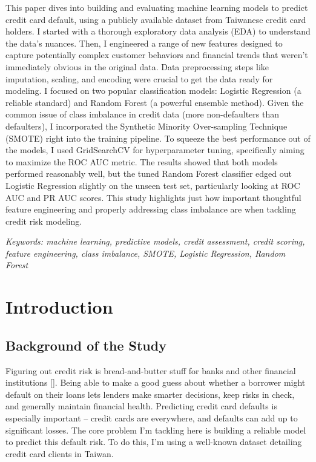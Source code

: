 \documentclass[a4paper,12pt]{article}
\begin{document}
This paper dives into building and evaluating machine learning models to predict credit card default, using a publicly available dataset from Taiwanese credit card holders. I started with a thorough exploratory data analysis (EDA) to understand the data's nuances. Then, I engineered a range of new features designed to capture potentially complex customer behaviors and financial trends that weren't immediately obvious in the original data. Data preprocessing steps like imputation, scaling, and encoding were crucial to get the data ready for modeling. I focused on two popular classification models: Logistic Regression (a reliable standard) and Random Forest (a powerful ensemble method). Given the common issue of class imbalance in credit data (more non-defaulters than defaulters), I incorporated the Synthetic Minority Over-sampling Technique (SMOTE) right into the training pipeline. To squeeze the best performance out of the models, I used GridSearchCV for hyperparameter tuning, specifically aiming to maximize the ROC AUC metric. The results showed that both models performed reasonably well, but the tuned Random Forest classifier edged out Logistic Regression slightly on the unseen test set, particularly looking at ROC AUC and PR AUC scores. This study highlights just how important thoughtful feature engineering and properly addressing class imbalance are when tackling credit risk modeling.

\textit{Keywords: machine learning, predictive models, credit assessment, credit scoring, feature engineering, class imbalance, SMOTE, Logistic Regression, Random Forest}

\newpage

\pagestyle{plain}

\section{Introduction}\label{introduction}

\subsection{Background of the Study}

Figuring out credit risk is bread-and-butter stuff for banks and other financial institutions [\cite{hand1997statistical}]. Being able to make a good guess about whether a borrower might default on their loans lets lenders make smarter decisions, keep risks in check, and generally maintain financial health. Predicting credit card defaults is especially important – credit cards are everywhere, and defaults can add up to significant losses. The core problem I'm tackling here is building a reliable model to predict this default risk. To do this, I'm using a well-known dataset detailing credit card clients in Taiwan.
\end{document}
